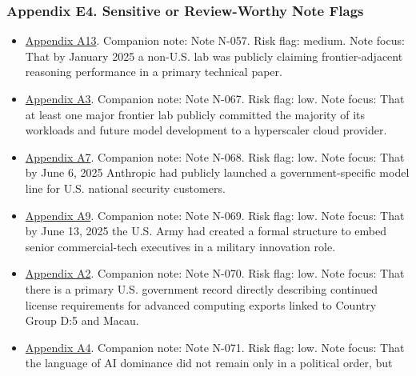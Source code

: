 \documentclass[
  american,
  11pt,
  letterpaper,
]{article}
\providecommand{\tightlist}{%
  \setlength{\itemsep}{0pt}\setlength{\parskip}{0pt}}
\begin{document}
\subsubsection{Appendix E4. Sensitive or Review-Worthy Note
Flags}\label{appendix-e4-sensitive-or-review-worthy-note-flags}

\begin{itemize}
\tightlist
\item
  \hyperref[appendix-a13-deepseek-r1-incentivizing-reasoning-capability-in-llms-via-reinforcement-learning]{Appendix
  A13}. Companion note: Note N-057. Risk flag: medium. Note focus: That
  by January 2025 a non-U.S. lab was publicly claiming frontier-adjacent
  reasoning performance in a primary technical paper.
\item
  \hyperref[appendix-a3-amazon-and-anthropic-announce-strategic-collaboration-to-advance-generative-ai]{Appendix
  A3}. Companion note: Note N-067. Risk flag: low. Note focus: That at
  least one major frontier lab publicly committed the majority of its
  workloads and future model development to a hyperscaler cloud
  provider.
\item
  \hyperref[appendix-a7-claude-gov-models-for-u-s-national-security-customers]{Appendix
  A7}. Companion note: Note N-068. Risk flag: low. Note focus: That by
  June 6, 2025 Anthropic had publicly launched a government-specific
  model line for U.S. national security customers.
\item
  \hyperref[appendix-a9-army-launches-detachment-201-executive-innovation-corps-to-drive-tech-transformation]{Appendix
  A9}. Companion note: Note N-069. Risk flag: low. Note focus: That by
  June 13, 2025 the U.S. Army had created a formal structure to embed
  senior commercial-tech executives in a military innovation role.
\item
  \hyperref[appendix-a2-guidance-regarding-enforcement-of-license-requirements-for-advanced-computing-items-for-entities-headquartered-in-country-group-d-5-and-macau]{Appendix
  A2}. Companion note: Note N-070. Risk flag: low. Note focus: That
  there is a primary U.S. government record directly describing
  continued license requirements for advanced computing exports linked
  to Country Group D:5 and Macau.
\item
  \hyperref[appendix-a4-request-for-information-on-the-development-of-an-artificial-intelligence-ai-action-plan]{Appendix
  A4}. Companion note: Note N-071. Risk flag: low. Note focus: That the
  language of AI dominance did not remain only in a political order, but

\end{itemize}
\end{document}
